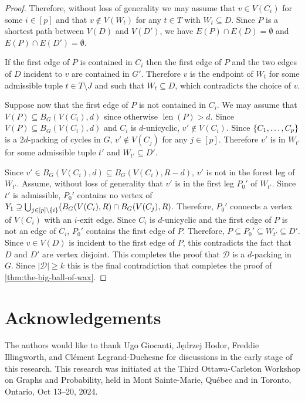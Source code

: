 \documentclass{patmorin}
\DeclareMathOperator{\len}{len}
\DeclarePairedDelimiter\set{\{}{\}}
\begin{document}
\begin{proof}
Therefore, without loss of generality we may assume that $v\in V(C_i)$ for some $i\in[p]$ and that $v\notin V(W_t)$ for any $t\in T$ with $W_t\subseteq D$.  Since $P$ is a shortest path between $V(D)$ and $V(D')$, we have $E(P)\cap E(D)=\emptyset$ and $E(P)\cap E(D')=\emptyset$.  

If the first edge of $P$ is contained in $C_i$ then the first edge of $P$ and the two edges of $D$ incident to $v$ are contained in $G'$.  Therefore $v$ is the endpoint of $W_t$ for some admissible tuple $t\in T\setminus J$ and such that $W_t\subseteq D$, which contradicts the choice of $v$.


Suppose now that the first edge of $P$ is not contained in $C_i$.  We may assume that $V(P)\subseteq B_G(V(C_i),d)$ since otherwise $\len(P)>d$.  Since $V(P)\subseteq B_G(V(C_i),d)$ and $C_i$ is $d$-unicyclic, $v'\not\in V(C_i)$.  Since $\set{C_1,\ldots,C_p}$ 
is a $2d$-packing of cycles in $G$, $v'\not\in V(C_j)$ for any $j\in[p]$. Therefore $v'$ is in $W_{t'}$ for some admissible tuple $t'$ and $W_{t'}\subseteq D'$.  

Since $v'\in B_G(V(C_i),d)\subseteq B_G(V(C_i),R-d)$, $v'$ is not in the forest leg of $W_{t'}$.  
Assume, without loss of generality that $v'$ is in the first leg $P_0'$ of $W_{t'}$.  
Since $t'$ is admissible, $P_0'$ contains no vertex of $Y_1\supseteq \bigcup_{j\in[p]\setminus \set{i}} (B_G(V(C_i),R)\cap B_G(V(C_j),R)$. 
Therefore, $P_0'$ connects a vertex of $V(C_i)$ with an $i$-exit edge.
Since $C_i$ is $d$-unicyclic and the first edge of $P$ is not an edge of $C_i$, $P_0'$ contains the first edge of $P$. Therefore, $P\subseteq P_0'\subseteq W_{t'}\subseteq D'$.  Since $v\in V(D)$ is incident to the first edge of $P$, this contradicts the fact that $D$ and $D'$ are vertex disjoint.
This completes the proof that $\mathcal{D}$ is a $d$-packing in $G$. Since $|\mathcal{D}|\geq k$ this is the final contradiction that completes the proof of \cref{thm:the-big-ball-of-wax}.
\end{proof}

\section*{Acknowledgements}
The authors would like to thank 
Ugo Giocanti,
Jędrzej Hodor, 
Freddie Illingworth, and 
Clément Legrand-Duchesne 
for discussions in the early stage of this research.
This research was initiated at the Third Ottawa-Carleton Workshop on Graphs and Probability, held in Mont Sainte-Marie, Québec and in Toronto, Ontario, Oct 13–20, 2024.
\end{document}
